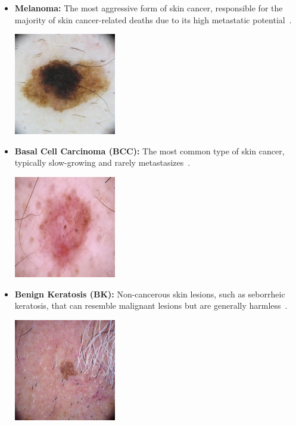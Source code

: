 \documentclass[a4paper,12pt]{report}
\begin{document}
\begin{spacing}{1.5}
    \begin{itemize}
        \item \textbf{Melanoma:} The most aggressive form of skin cancer, responsible for the majority of skin cancer-related deaths due to its high metastatic potential~\cite{dl12,dl15}.
        
        \begin{center}
            \includegraphics[width=0.35\textwidth]{Pics/cancer/melanoma.jpg}
        \end{center}

        \item \textbf{Basal Cell Carcinoma (BCC):} The most common type of skin cancer, typically slow-growing and rarely metastasizes~\cite{dl12,dl13}.
        
        \begin{center}
            \includegraphics[width=0.35\textwidth]{Pics/cancer/bcc.jpg}
        \end{center}

        \item \textbf{Benign Keratosis (BK):} Non-cancerous skin lesions, such as seborrheic keratosis, that can resemble malignant lesions but are generally harmless~\cite{dl14}.
        
        \begin{center}
            \includegraphics[width=0.35\textwidth]{Pics/cancer/bk.jpg}
        \end{center}


\end{itemize}
\end{spacing}
\end{document}

